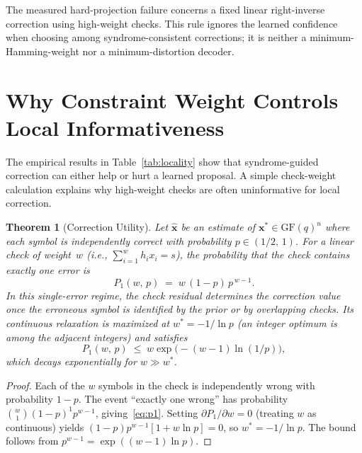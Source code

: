 \documentclass[11pt,a4paper]{article}
\newtheorem{theorem}{Theorem}
\begin{document}
The measured hard-projection failure concerns a fixed linear
right-inverse correction using high-weight checks. This rule ignores the
learned confidence when choosing among syndrome-consistent corrections;
it is neither a minimum-Hamming-weight nor a minimum-distortion decoder.

\section{Why Constraint Weight Controls Local Informativeness}
\label{sec:theory}

The empirical results in Table~\ref{tab:locality} show that
syndrome-guided correction can either help or hurt a learned proposal. A simple
check-weight calculation explains why high-weight checks are often
uninformative for local correction.

\begin{theorem}[Correction Utility]\label{thm:utility}
Let $\hat{\mathbf{x}}$ be an estimate of $\mathbf{x}^* \in
\mathrm{GF}(q)^n$ where each symbol is independently correct with
probability $p \in (1/2,\,1)$. For a linear check of weight~$w$
(i.e., $\sum_{i=1}^{w} h_i x_i = s$), the probability that the check
contains exactly one error is
\begin{equation}\label{eq:p1}
  P_1(w,\,p) \;=\; w\,(1-p)\,p^{\,w-1}.
\end{equation}
In this single-error regime, the check residual determines the correction
value once the erroneous symbol is identified by the prior or by overlapping
checks.
Its continuous relaxation is maximized at $w^* = -1/\!\ln p$
(an integer optimum is among the adjacent integers) and satisfies
\begin{equation}
  P_1(w,\,p) \;\leq\; w \exp\!\bigl(-(w-1)\ln(1/p)\bigr),
\end{equation}
which decays exponentially for $w \gg w^*$.
\end{theorem}

\begin{proof}
Each of the $w$ symbols in the check is independently wrong with
probability $1-p$. The event ``exactly one wrong'' has probability
$\binom{w}{1}(1-p)^1 p^{w-1}$, giving~\eqref{eq:p1}. Setting
$\partial P_1/\partial w = 0$ (treating $w$ as continuous) yields
$(1-p)p^{w-1}[1 + w\ln p] = 0$, so $w^* = -1/\!\ln p$. The bound
follows from $p^{w-1} = \exp((w{-}1)\ln p)$.
\end{proof}
\end{document}
